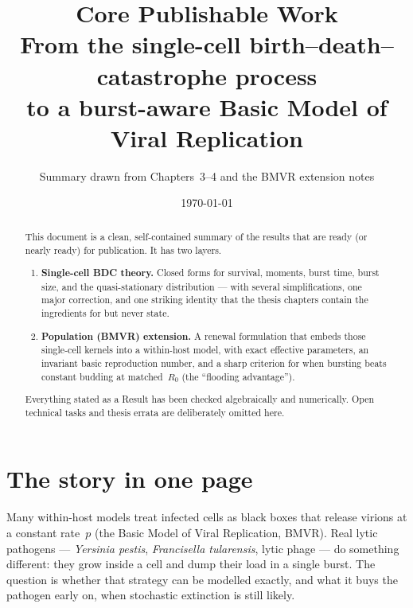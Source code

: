 \documentclass[11pt,a4paper]{article}
\title{\textbf{Core Publishable Work}\\[0.35em]
\large From the single-cell birth--death--catastrophe process\\
to a burst-aware Basic Model of Viral Replication}
\author{Summary drawn from Chapters~3--4 and the BMVR extension notes}
\date{\today}
\theoremstyle{plain}
\theoremstyle{definition}
\theoremstyle{remark}
\begin{document}
\maketitle
\vspace{-1.5em}

\begin{abstract}
\noindent
This document is a clean, self-contained summary of the results that are ready
(or nearly ready) for publication. It has two layers.

\begin{enumerate}[leftmargin=1.4em]
\item \textbf{Single-cell BDC theory.} Closed forms for survival, moments,
burst time, burst size, and the quasi-stationary distribution --- with several
simplifications, one major correction, and one striking identity that the thesis
chapters contain the ingredients for but never state.
\item \textbf{Population (BMVR) extension.} A renewal formulation that embeds
those single-cell kernels into a within-host model, with exact effective
parameters, an invariant basic reproduction number, and a sharp criterion for when
bursting beats constant budding at matched~$R_0$ (the ``flooding advantage'').
\end{enumerate}
Everything stated as a Result has been checked algebraically and numerically.
Open technical tasks and thesis errata are deliberately omitted here.
\end{abstract}

\tableofcontents
\clearpage

\section{The story in one page}

Many within-host models treat infected cells as black boxes that release virions
at a constant rate~$p$ (the Basic Model of Viral Replication, BMVR). Real
lytic pathogens --- \textit{Yersinia pestis}, \textit{Francisella tularensis},
lytic phage --- do something different: they grow inside a cell and dump their
load in a single burst. The question is whether that strategy can be modelled
exactly, and what it buys the pathogen early on, when stochastic extinction is
still likely.
\end{document}
